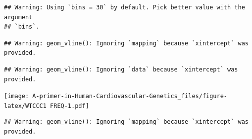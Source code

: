 \documentclass[
]{book}
\newenvironment{Shaded}{\begin{snugshade}}{\end{snugshade}}
\newcommand{\AttributeTok}[1]{\textcolor[rgb]{0.77,0.63,0.00}{#1}}
\newcommand{\ConstantTok}[1]{\textcolor[rgb]{0.00,0.00,0.00}{#1}}
\newcommand{\DecValTok}[1]{\textcolor[rgb]{0.00,0.00,0.81}{#1}}
\newcommand{\FloatTok}[1]{\textcolor[rgb]{0.00,0.00,0.81}{#1}}
\newcommand{\FunctionTok}[1]{\textcolor[rgb]{0.00,0.00,0.00}{#1}}
\newcommand{\NormalTok}[1]{#1}
\newcommand{\OtherTok}[1]{\textcolor[rgb]{0.56,0.35,0.01}{#1}}
\newcommand{\SpecialCharTok}[1]{\textcolor[rgb]{0.00,0.00,0.00}{#1}}
\newcommand{\StringTok}[1]{\textcolor[rgb]{0.31,0.60,0.02}{#1}}
\begin{document}
\begin{verbatim}
## Warning: Using `bins = 30` by default. Pick better value with the argument
## `bins`.
\end{verbatim}

\begin{verbatim}
## Warning: geom_vline(): Ignoring `mapping` because `xintercept` was provided.
\end{verbatim}

\begin{verbatim}
## Warning: geom_vline(): Ignoring `data` because `xintercept` was provided.
\end{verbatim}

\texttt{[image: A-primer-in-Human-Cardiovascular-Genetics\_files/figure-latex/WTCCC1 FREQ-1.pdf]}

\begin{Shaded}
\end{Shaded}

\begin{verbatim}
## Warning: geom_vline(): Ignoring `mapping` because `xintercept` was provided.
\end{verbatim}
\end{document}
